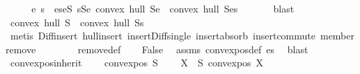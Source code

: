 \begin{isabellebody}
\ \ \isamarkupfalse%
\ \isamarkupfalse%
\ e\ s\ \ es{\isacharcolon}{\kern0pt}{\isachardoublequoteopen}e{\isasymin}S{\isachardoublequoteclose}\ {\isachardoublequoteopen}s{\isasymin}S{\isacharminus}{\kern0pt}{\isacharbraceleft}{\kern0pt}e{\isacharbraceright}{\kern0pt}{\isachardoublequoteclose}\ {\isachardoublequoteopen}convex\ hull\ {\isacharparenleft}{\kern0pt}S{\isacharminus}{\kern0pt}{\isacharbraceleft}{\kern0pt}e{\isacharbraceright}{\kern0pt}{\isacharparenright}{\kern0pt}\ {\isacharequal}{\kern0pt}\ convex\ hull\ {\isacharparenleft}{\kern0pt}S{\isacharminus}{\kern0pt}{\isacharbraceleft}{\kern0pt}e{\isacharbraceright}{\kern0pt}{\isacharminus}{\kern0pt}{\isacharbraceleft}{\kern0pt}s{\isacharbraceright}{\kern0pt}{\isacharparenright}{\kern0pt}{\isachardoublequoteclose}\ \isanewline
\ \ \ \ \isamarkupfalse%
\ blast\isanewline
\ \ \isamarkupfalse%
\ {\isachardoublequoteopen}convex\ hull\ S\ {\isacharequal}{\kern0pt}\ convex\ hull\ {\isacharparenleft}{\kern0pt}S{\isacharminus}{\kern0pt}{\isacharbraceleft}{\kern0pt}s{\isacharbraceright}{\kern0pt}{\isacharparenright}{\kern0pt}{\isachardoublequoteclose}\isanewline
\ \ \ \ \isamarkupfalse%
\ {\isacharparenleft}{\kern0pt}metis\ Diff{\isacharunderscore}{\kern0pt}insert\ hull{\isacharunderscore}{\kern0pt}insert\ insert{\isacharunderscore}{\kern0pt}Diff{\isacharunderscore}{\kern0pt}single\ insert{\isacharunderscore}{\kern0pt}absorb\ insert{\isacharunderscore}{\kern0pt}commute\ member{\isacharunderscore}{\kern0pt}remove\isanewline
\ \ \ \ \ \ \ \ remove{\isacharunderscore}{\kern0pt}def{\isacharparenright}{\kern0pt}\isanewline
\ \ \isamarkupfalse%
\ False\ \isamarkupfalse%
\ assms\ convex{\isacharunderscore}{\kern0pt}pos{\isacharunderscore}{\kern0pt}def\ es{\isacharparenleft}{\kern0pt}{}{\isacharparenright}{\kern0pt}\ \isamarkupfalse%
\ blast\isanewline
{}\isamarkupfalse%
%
\endisatagproof
{\isafoldproof}%
%
\isadelimproof
\isanewline
%
\endisadelimproof
\isanewline
{}\isamarkupfalse%
\ convex{\isacharunderscore}{\kern0pt}pos{\isacharunderscore}{\kern0pt}inherit{\isacharcolon}{\kern0pt}\ \isanewline
\ \ \ {\isachardoublequoteopen}convex{\isacharunderscore}{\kern0pt}pos\ S{\isachardoublequoteclose}\isanewline
\ \ \ {\isachardoublequoteopen}{\isasymforall}\ X\ {\isasymsubseteq}\ S{\isachardot}{\kern0pt}\ convex{\isacharunderscore}{\kern0pt}pos\ X{\isachardoublequoteclose}\isanewline

\end{isabellebody}
